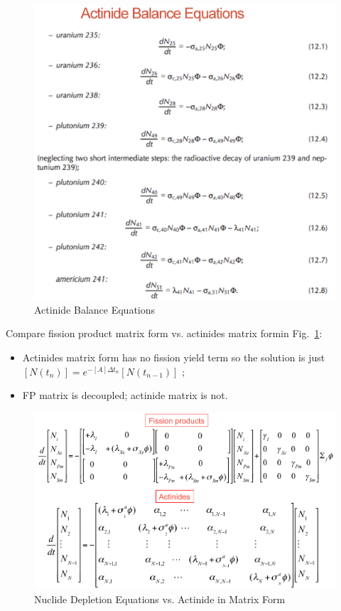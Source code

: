 \documentclass{school-22.211-notes}
\begin{document}
\begin{figure}[ht]
  \centering
  \includegraphics[width=5in]{images/dfs/actinide-balance.png}
  \caption{Actinide Balance Equations}
\end{figure}

\clearpage
{} 

Compare fission product matrix form vs. actinides matrix formin
Fig.~\ref{fp-an-matrix-form}:

\begin{itemize}
\item Actinides matrix form has no fission yield term so the solution
  is just $[N(t_n)] = e^{-[A] \Delta t_n} [N(t_{n-1})]$ ;

\item FP matrix is decoupled; actinide matrix is not. 
\end{itemize}
\begin{figure}[ht]
  \centering
  \includegraphics[width=5in]{images/dfs/fp-an-matrix-form.png}
  \caption{Nuclide Depletion Equations vs. Actinide in Matrix
    Form} \label{fp-an-matrix-form}
\end{figure}
\end{document}
